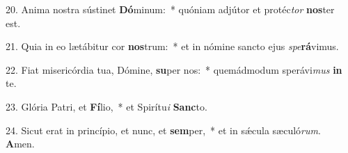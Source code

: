 20. Anima nostra sústinet \textbf{Dó}minum:~*  quóniam adjútor et protéc\textit{tor} \textbf{nos}ter est.\

21. Quia in eo lætábitur cor \textbf{nos}trum:~*  et in nómine sancto ejus \textit{spe}\textbf{rá}vimus.\

22. Fiat misericórdia tua, Dómine, \textbf{su}per nos:~*  quemádmodum sperávi\textit{mus} \textbf{in} te.\

23. Glória Patri, et \textbf{Fí}lio,~*  et Spirítu\textit{i} \textbf{Sanc}to.\

24. Sicut erat in princípio, et nunc, et \textbf{sem}per,~*  et in sǽcula sæculó\textit{rum}. \textbf{A}men.\


